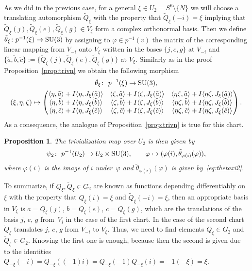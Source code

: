 \documentclass[pdftex]{sigma}
\numberwithin{equation}{section}
\newtheorem{Proposition}[Theorem]{Proposition}
 { \theoremstyle{definition}
\newtheorem{Definition}[Theorem]{Definition}
\newtheorem{Remark}[Theorem]{Remark} }
\begin{document}
As we did in the previous case, for a general $\xi \in U_2=S^6{\setminus}\{ N \}$ we will choose a translating auto\-morphism $\tilde{Q}_\xi$ with the property that $\tilde{Q}_\xi(-i)=\xi$ implying that $\tilde{Q}_\xi (j),\tilde{Q}_\xi (e),\tilde{Q}_\xi (g) \in V_\xi$ form a complex orthonormal basis. Then we define $\tilde{\theta}_\xi \colon p^{-1}(\xi) \rightarrow {\rm SU}(3)$ by assigning to $\varphi \in p^{-1}(v)$ the matrix of the corresponding linear mapping from $V_{-i}$ onto $V_{\xi}$ written in the bases $\{j,e,g\}$ at $V_{-i}$ and $\big\{\tilde{a},\tilde{b},\tilde{c} \big\} := \big\{\tilde{Q}_\xi (j),\tilde{Q}_\xi (e),\tilde{Q}_\xi (g)\big\}$ at $V_\xi$. Similarly as in the proof Proposition~\ref{prop:trivn} we obtain the following morphism
\begin{gather}
\tilde{\theta}_\xi \colon \ p^{-1}(\xi) \rightarrow {\rm SU}(3), \nonumber\\
(\xi,\eta,\zeta) \mapsto
\begin{pmatrix}
\langle \eta,\tilde{a} \rangle + I\langle \eta,J_\xi(\tilde{a}) \rangle & \langle \zeta,\tilde{a} \rangle + I\langle \zeta,J_\xi(\tilde{a}) \rangle & \langle \eta \zeta,\tilde{a} \rangle + I\langle \eta \zeta,J_\xi(\tilde{a}) \rangle\\
\langle \eta,\tilde{b} \rangle +I\langle \eta,J_\xi(\tilde{b}) \rangle & \langle \zeta,\tilde{b} \rangle +I\langle \zeta,J_\xi(\tilde{b}) \rangle & \langle \eta \zeta,\tilde{b} \rangle +I\langle \eta \zeta,J_\xi(\tilde{b}) \rangle\\
\langle \eta,\tilde{c} \rangle +I\langle \eta,J_\xi(\tilde{c}) \rangle & \langle \zeta,\tilde{c} \rangle +I\langle \zeta,J_\xi(\tilde{c}) \rangle & \langle \eta \zeta,\tilde{c} \rangle +I\langle \eta \zeta,J_\xi(\tilde{c}) \rangle
\end{pmatrix}.\label{eq:thetaxi2}
\end{gather}
As a consequence, the analogue of Proposition~\ref{prop:trivn} is true for this chart.
\begin{Proposition} \label{prop:trivs} The trivialization map over $U_2$ is then given by
 \[\psi_2\colon \ p^{-1}(U_2) \rightarrow U_2 \times {\rm SU}(3), \qquad \varphi \mapsto (\varphi(i),\tilde{\theta}_{\varphi(i)}(\varphi) ),\]
 where $\varphi(i)$ is the image of $i$ under~$\varphi$ and $\tilde{\theta}_{\varphi(i)}(\varphi)$ is given by~\eqref{eq:thetaxi2}.
\end{Proposition}

To summarize, if $Q_\xi ,\tilde{Q}_\xi \in G_2$ are known as functions depending differentiably on $\xi$ with the property that $Q_\xi(i)=\xi$ and $\tilde{Q}_\xi(-i)=\xi$, then an appropriate basis in $V_\xi$ is $a=Q_\xi(j)$, $b=Q_\xi(e)$, $c=Q_\xi(g)$, which are the translations of the basis $j$, $e$, $g$ from~$V_i$ in the case of the first chart. In the case of the second chart~$\tilde{Q}_\xi$ translates $j$, $e$, $g$ from $V_{-i}$ to $V_\xi$. Thus, we need to find elements $Q_\xi \in G_2$ and $\tilde{Q}_\xi \in G_2$. Knowing the first one is enough, because then the second is given due to the identities $Q_{-\xi}(-i)=Q_{-\xi}((-1)i)=Q_{-\xi}(-1)Q_{-\xi}(i)=-1(-\xi)=\xi$.
\end{document}
